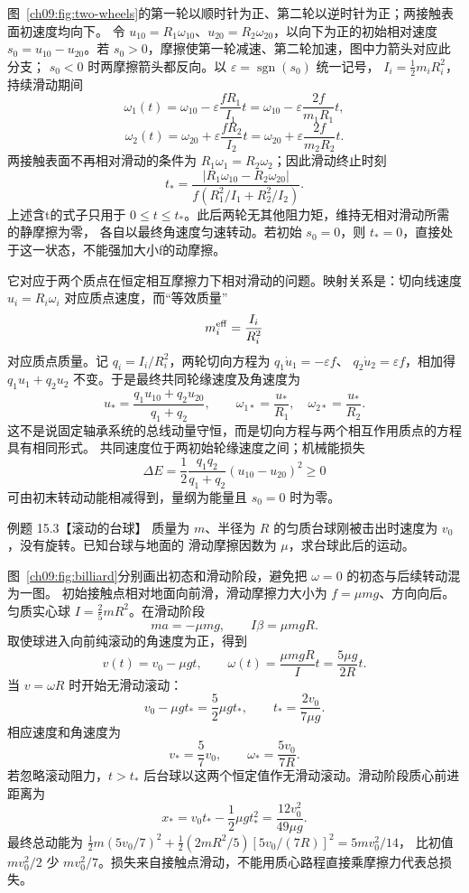 \begin{xesolution}
图~\ref{ch09:fig:two-wheels}的第一轮以顺时针为正、第二轮以逆时针为正；两接触表面初速度均向下。
令 $u_{10}=R_1\omega_{10}$、$u_{20}=R_2\omega_{20}$，以向下为正的初始相对速度
$s_0=u_{10}-u_{20}$。若 $s_0>0$，摩擦使第一轮减速、第二轮加速，图中力箭头对应此分支；
$s_0<0$ 时两摩擦箭头都反向。以 $\varepsilon=\operatorname{sgn}(s_0)$ 统一记号，
$I_i=\tfrac12m_iR_i^2$，持续滑动期间
\[
 \boxed{\omega_1(t)=\omega_{10}-\varepsilon\frac{fR_1}{I_1}t
 =\omega_{10}-\varepsilon\frac{2f}{m_1R_1}t},
\]
\[
 \boxed{\omega_2(t)=\omega_{20}+\varepsilon\frac{fR_2}{I_2}t
 =\omega_{20}+\varepsilon\frac{2f}{m_2R_2}t}.
\]
两接触表面不再相对滑动的条件为 $R_1\omega_1=R_2\omega_2$；因此滑动终止时刻
\[
 \boxed{t_*=
 \frac{|R_1\omega_{10}-R_2\omega_{20}|}
 {f(R_1^2/I_1+R_2^2/I_2)}}.
\]
上述含t的式子只用于 $0\le t\le t_*$。此后两轮无其他阻力矩，维持无相对滑动所需的静摩擦为零，
各自以最终角速度匀速转动。若初始 $s_0=0$，则 $t_*=0$，直接处于这一状态，不能强加大小f的动摩擦。

它对应于两个质点在恒定相互摩擦力下相对滑动的问题。映射关系是：切向线速度
$u_i=R_i\omega_i$ 对应质点速度，而“等效质量”
\[
 m_i^{\rm eff}=\frac{I_i}{R_i^2}
\]
对应质点质量。记 $q_i=I_i/R_i^2$，两轮切向方程为 $q_1\dot u_1=-\varepsilon f$、
$q_2\dot u_2=\varepsilon f$，相加得 $q_1u_1+q_2u_2$ 不变。于是最终共同轮缘速度及角速度为
\[
 u_* =\frac{q_1u_{10}+q_2u_{20}}{q_1+q_2},\qquad
 \omega_{1*}=\frac{u_*}{R_1},\quad \omega_{2*}=\frac{u_*}{R_2}.
\]
这不是说固定轴承系统的总线动量守恒，而是切向方程与两个相互作用质点的方程具有相同形式。
共同速度位于两初始轮缘速度之间；机械能损失
\[
 \Delta E=\frac12\frac{q_1q_2}{q_1+q_2}(u_{10}-u_{20})^2\ge0
\]
可由初末转动动能相减得到，量纲为能量且 $s_0=0$ 时为零。
\end{xesolution}

\Needspace{0.34\textheight}
\begin{origexamplebox}{例题 15.3【滚动的台球】}
质量为 $m$、半径为 $R$ 的匀质台球刚被击出时速度为 $v_0$，没有旋转。已知台球与地面的
滑动摩擦因数为 $\mu$，求台球此后的运动。
\billiardRollingDiagram
\end{origexamplebox}

\begin{xesolution}
图~\ref{ch09:fig:billiard}分别画出初态和滑动阶段，避免把 $\omega=0$ 的初态与后续转动混为一图。
初始接触点相对地面向前滑，滑动摩擦力大小为 $f=\mu mg$、方向向后。匀质实心球
$I=\tfrac25mR^2$。在滑动阶段
\[
 ma=-\mu mg,
 \qquad I\beta=\mu mgR.
\]
取使球进入向前纯滚动的角速度为正，得到
\[
 v(t)=v_0-\mu gt,
 \qquad
 \omega(t)=\frac{\mu mgR}{I}t=\frac{5\mu g}{2R}t.
\]
当 $v=\omega R$ 时开始无滑动滚动：
\[
 v_0-\mu gt_* =\frac52\mu gt_*,
 \qquad
 \boxed{t_* =\frac{2v_0}{7\mu g}}.
\]
相应速度和角速度为
\[
 \boxed{v_* =\frac57v_0},
 \qquad
 \boxed{\omega_* =\frac{5v_0}{7R}}.
\]
若忽略滚动阻力，$t>t_*$ 后台球以这两个恒定值作无滑动滚动。滑动阶段质心前进距离为
\[
 \boxed{x_* =v_0t_* -\frac12\mu gt_*^2
 =\frac{12v_0^2}{49\mu g}}.
\]
最终总动能为 $\tfrac12m(5v_0/7)^2+\tfrac12(2mR^2/5)[5v_0/(7R)]^2=5mv_0^2/14$，
比初值 $mv_0^2/2$ 少 $mv_0^2/7$。损失来自接触点滑动，不能用质心路程直接乘摩擦力代表总损失。
\end{xesolution}

